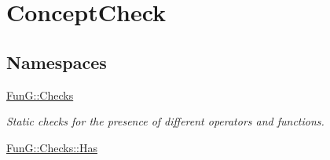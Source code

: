 \hypertarget{group__ConceptCheck}{}\section{Concept\+Check}
\label{group__ConceptCheck}
\subsection*{Namespaces}
\begin{DoxyCompactItemize}
\item 
 \hyperlink{namespaceFunG_1_1Checks}{Fun\+G\+::\+Checks}
\begin{DoxyCompactList}\small\item\em Static checks for the presence of different operators and functions. \end{DoxyCompactList}\item 
 \hyperlink{namespaceFunG_1_1Checks_1_1Has}{Fun\+G\+::\+Checks\+::\+Has}
\end{DoxyCompactItemize}

